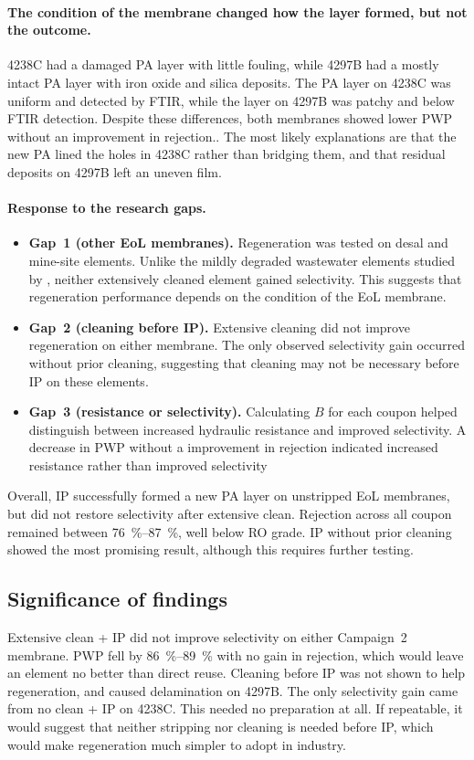 \paragraph{The condition of the membrane changed how the layer formed, but not the outcome.}
4238C had a damaged PA layer with little fouling, while 4297B had a mostly intact PA layer with iron oxide and silica deposits. The PA layer on 4238C was uniform and detected by FTIR, while the layer on 4297B was patchy and below FTIR detection. Despite these differences, both membranes showed lower PWP without an improvement in rejection.. The most likely explanations are that the new PA lined the holes in 4238C rather than bridging them, and that residual deposits on 4297B left an uneven film.

\paragraph{Response to the research gaps.}
\begin{itemize}[nosep]
  \item \textbf{Gap~1 (other EoL membranes).} Regeneration was tested on desal and mine-site elements. Unlike the mildly degraded wastewater elements studied by \citet{Ogbe2026}, neither extensively cleaned element gained selectivity. This suggests that regeneration performance depends on the condition of the EoL membrane.
  \item \textbf{Gap~2 (cleaning before IP).} Extensive cleaning did not improve regeneration on either membrane. The only observed selectivity gain occurred without prior cleaning, suggesting that cleaning may not be necessary before IP on these elements.
  \item \textbf{Gap~3 (resistance or selectivity).} Calculating $B$ for each coupon helped distinguish between increased hydraulic resistance and improved selectivity. A decrease in PWP without a improvement in rejection indicated increased resistance rather than improved selectivity
\end{itemize}

Overall, IP successfully formed a new PA layer on unstripped EoL membranes, but did not restore selectivity after extensive clean. Rejection across all coupon remained between \qtyrange{76}{87}{\percent}, well below RO grade. IP without prior cleaning showed the most promising result, although this requires further testing. 

\subsection*{Significance of findings}
Extensive clean + IP did not improve selectivity on either Campaign~2 membrane. PWP fell by \qtyrange{86}{89}{\percent} with no gain in rejection, which would leave an element no better than direct reuse. Cleaning before IP was not shown to help regeneration, and caused delamination on 4297B. The only selectivity gain came from no clean + IP on 4238C. This needed no preparation at all. If repeatable, it would suggest that neither stripping nor cleaning is needed before IP, which would make regeneration much simpler to adopt in industry. 

